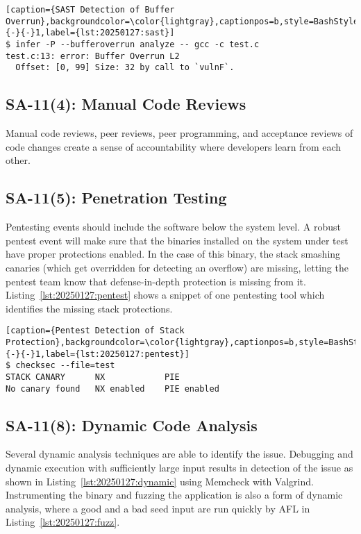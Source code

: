 \begin{lstlisting}[caption={SAST Detection of Buffer Overrun},backgroundcolor=\color{lightgray},captionpos=b,style=BashStyle,literate={-}{-}1,label={lst:20250127:sast}]
$ infer -P --bufferoverrun analyze -- gcc -c test.c
test.c:13: error: Buffer Overrun L2
  Offset: [0, 99] Size: 32 by call to `vulnF`.
\end{lstlisting}

\subsection*{SA-11(4): Manual Code Reviews}
Manual code reviews, peer reviews, peer programming, and acceptance reviews of code changes create a sense of accountability where developers learn from each other.

\subsection*{SA-11(5): Penetration Testing}
Pentesting events should include the software below the system level. A robust pentest event will make sure that the binaries installed on the system under test have proper protections enabled. In the case of this binary, the stack smashing canaries (which get overridden for detecting an overflow) are missing, letting the pentest team know that defense-in-depth protection is missing from it. Listing~\ref{lst:20250127:pentest} shows a snippet of one pentesting tool which identifies the missing stack protections.

\begin{lstlisting}[caption={Pentest Detection of Stack Protection},backgroundcolor=\color{lightgray},captionpos=b,style=BashStyle,literate={-}{-}1,label={lst:20250127:pentest}]
$ checksec --file=test
STACK CANARY      NX            PIE
No canary found   NX enabled    PIE enabled
\end{lstlisting}

\subsection*{SA-11(8): Dynamic Code Analysis}
Several dynamic analysis techniques are able to identify the issue. Debugging and dynamic execution with sufficiently large input results in detection of the issue as shown in Listing~\ref{lst:20250127:dynamic} using Memcheck with Valgrind. Instrumenting the binary and fuzzing the application is also a form of dynamic analysis, where a good and a bad seed input are run quickly by AFL in Listing~\ref{lst:20250127:fuzz}.

